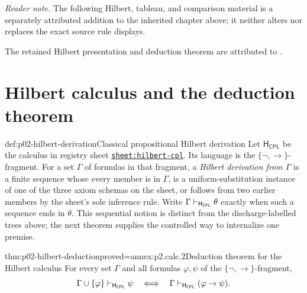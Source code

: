 \noindent\textit{Reader note.} The following Hilbert, tableau, and
comparison material is a separately attributed addition to the inherited
chapter above; it neither alters nor replaces the exact source rule displays.

The retained Hilbert presentation and deduction theorem are attributed to
\cite{Mendelson1997}.

\section{Hilbert calculus and the deduction theorem}
\label{sec:p02-hilbert-cpl}

\begin{hbdefinition}{def:p02-hilbert-derivation}{Classical propositional Hilbert derivation}
Let \(\mathsf H_{\mathsf{CPL}}\) be the calculus in registry sheet
\hyperref[sheet:hilbert-cpl]{\texttt{sheet:hilbert-cpl}}.  Its language is the
\(\{\neg,\to\}\)-fragment.  For a set \(\Gamma\) of formulas in that
fragment, a \emph{Hilbert derivation from \(\Gamma\)} is a finite sequence
whose every member is in \(\Gamma\), is a uniform-substitution instance of
one of the three axiom schemas on the sheet, or follows from two earlier
members by the sheet's sole inference rule.  Write
\(\Gamma\vdash_{\mathsf H_{\mathsf{CPL}}}\theta\) exactly when such a
sequence ends in \(\theta\).  This sequential notion is distinct from the
discharge-labelled trees above; the next theorem supplies the controlled
way to internalize one premise.
\end{hbdefinition}

\begin{hbtheorem}{thm:p02-hilbert-deduction}{proved=annex:p2.calc.2}{Deduction theorem for the Hilbert calculus}
For every set \(\Gamma\) and all formulas \(\varphi,\psi\) of the
\(\{\neg,\to\}\)-fragment,
\[
 \Gamma\cup\{\varphi\}\vdash_{\mathsf H_{\mathsf{CPL}}}\psi
 \quad\Longleftrightarrow\quad
 \Gamma\vdash_{\mathsf H_{\mathsf{CPL}}}(\varphi\to\psi).
\]
\end{hbtheorem}

